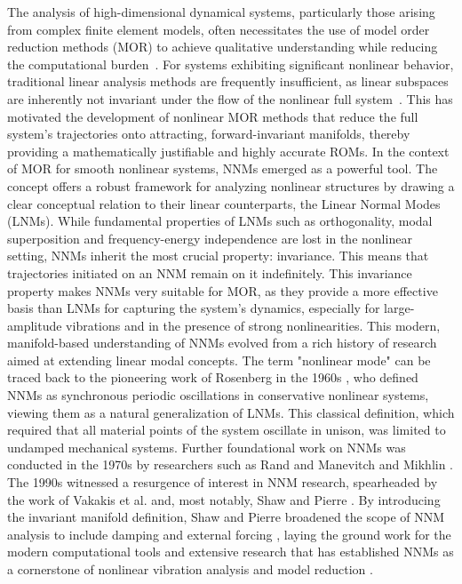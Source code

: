 \documentclass[a4paper,9pt,parskip=half,english]{article}
\theoremstyle{plain}
\theoremstyle{definition}
\begin{document}
The analysis of high-dimensional dynamical systems, particularly those arising from complex finite element models, often necessitates the use of model order reduction methods (MOR) to achieve qualitative understanding while reducing the computational burden~\cite{Kerschen2009,Touze2021}. For systems exhibiting significant nonlinear behavior, traditional linear analysis methods are frequently insufficient, as linear subspaces are inherently not invariant under the flow of the nonlinear full system~\cite{Haller2016}. This has motivated the development of nonlinear MOR methods that reduce the full system's trajectories onto attracting, forward-invariant manifolds, thereby providing a mathematically justifiable and highly accurate ROMs.
In the context of MOR for smooth nonlinear systems, NNMs emerged as a powerful tool. The concept offers a robust framework for analyzing nonlinear structures by drawing a clear conceptual relation to their linear counterparts, the Linear Normal Modes (LNMs). While fundamental properties of LNMs such as orthogonality, modal superposition and frequency-energy independence are lost in the nonlinear setting, NNMs inherit the most crucial property: invariance. This means that trajectories initiated on an NNM remain on it indefinitely. This invariance property makes NNMs very suitable for MOR, as they provide a more effective basis than LNMs for capturing the system's dynamics, especially for large-amplitude vibrations and in the presence of strong nonlinearities. This modern, manifold-based understanding of NNMs evolved from a rich history of research aimed at extending linear modal concepts. The term "nonlinear mode" can be traced back to the pioneering work of Rosenberg in the 1960s \cite{Rosenberg1960, Rosenberg1961, Rosenberg1962, Rosenberg1964, Rosenberg1964a, Rosenberg1966}, who defined NNMs as synchronous periodic oscillations in conservative nonlinear systems, viewing them as a natural generalization of LNMs. This classical definition, which required that all material points of the system oscillate in unison, was limited to undamped mechanical systems. Further foundational work on NNMs was conducted in the 1970s by researchers such as Rand \cite{Rand1971,Rand1971a,Rand1974} and Manevitch and Mikhlin \cite{Manevich1972}. The 1990s witnessed a resurgence of interest in NNM research, spearheaded by the work of Vakakis et al. \cite{Caughey1990,Vakakis1992,Vakakis1996,Vakakis1997} and, most notably, Shaw and Pierre \cite{Shaw1991,Shaw1993,Shaw1994}. By introducing the invariant manifold definition, Shaw and Pierre broadened the scope of NNM analysis to include damping \cite{Shaw1993} and external forcing \cite{Jiang2005}, laying the ground work for the modern computational tools and extensive research that has established NNMs as a cornerstone of nonlinear vibration analysis and model reduction \cite{Touze2006,Amabili2007,Touze2021}. 
\end{document}
